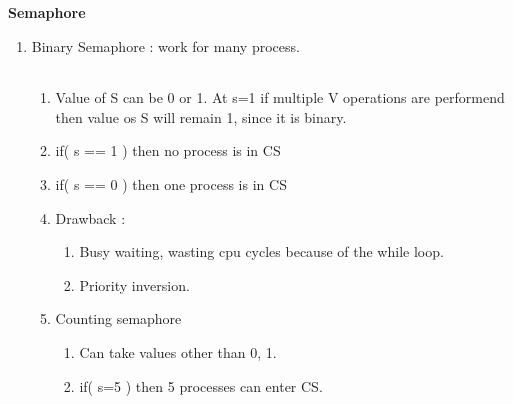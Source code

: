 
\centerline{\textbf{ \LARGE Semaphore}}



\begin{enumerate}

  \item Binary Semaphore : work for many process. \\
      \begin{myTableStyle}
        \begin{tabular}{ |m{4.5cm}|m{5cm}|m{3.5cm}| } \hline
               &
             &
             \\ \hline
        \end{tabular}
      \end{myTableStyle}
  \begin{enumerate}
    \item Value of S can be 0 or 1. At s=1 if multiple V operations are performend then value os S will remain 1, since it is binary.
    \item if( s == 1 ) then no   process is in CS
    \item if( s == 0 ) then one process is in CS
    \item Drawback :
    \begin{enumerate}
      \item Busy waiting, wasting cpu cycles because of the while loop.
      \item Priority inversion.
  \end{enumerate}
  \item Counting semaphore
  \begin{enumerate}
    \item Can take values other than 0, 1.
    \item if( s=5 ) then 5 processes can enter CS.
  \end{enumerate}
  \end{enumerate}


\end{enumerate}
